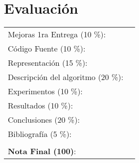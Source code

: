 \section*{Evaluación}

\begin{center}

    \begin{tabular}{ll}
    Mejoras 1ra Entrega (10 \%): &  \underline{\hspace{2cm}}\\
    Código Fuente (10 \%): &  \underline{\hspace{2cm}}\\
    Representación (15 \%):  & \underline{\hspace{2cm}} \\
    Descripción del algoritmo (20 \%):  & \underline{\hspace{2cm}} \\
    Experimentos (10 \%):  & \underline{\hspace{2cm}} \\
    Resultados (10 \%):  & \underline{\hspace{2cm}} \\
    Conclusiones (20 \%): &  \underline{\hspace{2cm}}\\
    Bibliografía (5 \%): & \underline{\hspace{2cm}}\\
    &  \\
    \textbf{Nota Final (100)}:   & \underline{\hspace{2cm}}
    \end{tabular}

\end{center}

